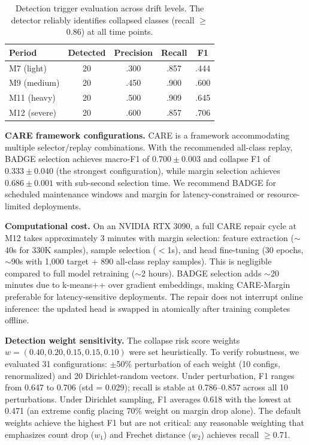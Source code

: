 \documentclass[journal]{IEEEtran}
\newcommand{\ours}{CARE}  %
\begin{document}
\begin{table}[t]
\centering
\caption{Detection trigger evaluation across drift levels. The detector reliably identifies collapsed classes (recall $\geq$0.86) at all time points.}
\label{tab:trigger_eval}
\small
\begin{tabular}{@{}l cccc@{}}
\toprule
Period & Detected & Precision & Recall & F1 \\
\midrule
M7 (light) & 20 & .300 & .857 & .444 \\
M9 (medium) & 20 & .450 & .900 & .600 \\
M11 (heavy) & 20 & .500 & .909 & .645 \\
M12 (severe) & 20 & .600 & .857 & .706 \\
\bottomrule
\end{tabular}
\end{table}

\textbf{\ours{} framework configurations.}
\ours{} is a framework accommodating multiple selector/replay combinations.
With the recommended all-class replay, BADGE selection achieves macro-F1 of $0.700{\pm}0.003$ and collapse F1 of $0.333{\pm}0.040$ (the strongest configuration), while margin selection achieves $0.686{\pm}0.001$ with sub-second selection time.
We recommend BADGE for scheduled maintenance windows and margin for latency-constrained or resource-limited deployments.

\textbf{Computational cost.}
On an NVIDIA RTX 3090, a full \ours{} repair cycle at M12 takes approximately 3 minutes with margin selection: feature extraction (${\sim}$40s for 330K samples), sample selection ($<$1s), and head fine-tuning (30 epochs, ${\sim}$90s with 1{,}000 target + 890 all-class replay samples).
This is negligible compared to full model retraining (${\sim}$2 hours).
BADGE selection adds ${\sim}$20 minutes due to k-means++ over gradient embeddings, making \ours{}-Margin preferable for latency-sensitive deployments.
The repair does not interrupt online inference: the updated head is swapped in atomically after training completes offline.

\textbf{Detection weight sensitivity.}
The collapse risk score weights $w = (0.40, 0.20, 0.15, 0.15, 0.10)$ were set heuristically.
To verify robustness, we evaluated 31 configurations: $\pm$50\% perturbation of each weight (10 configs, renormalized) and 20 Dirichlet-random vectors.
Under perturbation, F1 ranges from 0.647 to 0.706 (std = 0.029); recall is stable at 0.786--0.857 across all 10 perturbations.
Under Dirichlet sampling, F1 averages 0.618 with the lowest at 0.471 (an extreme config placing 70\% weight on margin drop alone).
The default weights achieve the highest F1 but are not critical: any reasonable weighting that emphasizes count drop ($w_1$) and Frechet distance ($w_2$) achieves recall $\geq$0.71.
\end{document}
